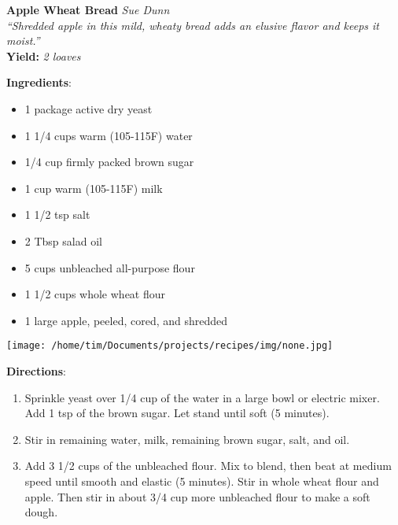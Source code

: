 \documentclass[11pt, twoside, openany]{book}
\begin{document}
\noindent\begin{minipage}[t]{\linewidth}%
{\Large\textbf{Apple Wheat Bread}} \label{apple-wheat-bread}\hfill\textit{Sue Dunn}\\
\textit{``Shredded apple in this mild, wheaty bread adds an elusive flavor and keeps it moist.''}\\
\textbf{Yield:} \textit{2 loaves}\\
\noindent\begin{minipage}[t]{0.78\linewidth}%
\textbf{Ingredients}:\vspace{-3mm}
\begin{multicols}{2}
\begin{itemize}\setlength\itemsep{-1mm}
\item 1 package active dry yeast
\item 1 1/4 cups warm (105-115F) water
\item 1/4 cup firmly packed brown sugar
\item 1 cup warm (105-115F) milk
\item 1 1/2 tsp salt
\item 2 Tbsp salad oil
\item 5 cups unbleached all-purpose flour
\item 1 1/2 cups whole wheat flour
\item 1 large apple, peeled, cored, and shredded
\end{itemize}
\end{multicols}
\end{minipage}
\noindent\begin{minipage}[t]{0.18\linewidth}
\centering \strut\vspace*{-\baselineskip}\newline
\texttt{[image: /home/tim/Documents/projects/recipes/img/none.jpg]}\\
\end{minipage}\vspace{3mm}
\textbf{Directions}:
\vspace{-3mm}\begin{enumerate}\setlength\itemsep{-1mm}
\item Sprinkle yeast over 1/4 cup of the water in a large bowl or electric mixer. Add 1 tsp of the brown sugar. Let stand until soft (5 minutes).
\item Stir in remaining water, milk, remaining brown sugar, salt, and oil.
\item Add 3 1/2 cups of the unbleached flour. Mix to blend, then beat at medium speed until smooth and elastic (5 minutes). Stir in whole wheat flour and apple. Then stir in about 3/4 cup more unbleached flour to make a soft dough.

\end{enumerate}
\end{minipage}
\end{document}
